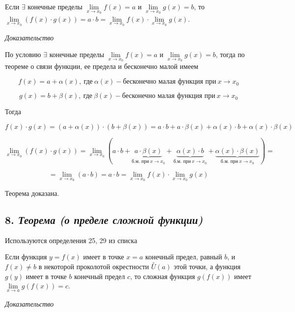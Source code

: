 Если $\exists$ конечные пределы $\lim\limits_{x \to x_0}f(x)=a$ и $\lim\limits_{x \to x_0}g(x) = b$, то $\lim\limits_{x \to x_0}(f(x)\cdot g(x)) = a\cdot b = \lim\limits_{x \to x_0}f(x)\cdot \lim\limits_{x \to x_0}g(x)$.
\vspace*{20pt} 

\textit{Доказательство}

По условию $\exists$ конечные пределы $\lim\limits_{x \to x_0}f(x)=a$ и $\lim\limits_{x \to x_0}g(x) = b$, тогда по теореме о связи функции, ее предела и бесконечно малой имеем

$$
f(x) = a + \alpha(x), \ \text{где} \ \alpha(x) - \text{бесконечно малая функция при} \ x \rightarrow x_0 
$$

$$
g(x) = b + \beta(x), \ \text{где} \ \beta(x) - \text{бесконечно малая функция при} \ x \rightarrow x_0 
$$

Тогда

$$
f(x)\cdot g(x) = (a + \alpha(x))\cdot(b + \beta(x)) = a\cdot b + a\cdot \beta(x) + \alpha(x)\cdot b + \alpha(x)\cdot \beta(x)
$$

$$
\lim\limits_{x \to x_0}(f(x)\cdot g(x)) = \lim\limits_{x \to x_0}(a\cdot b + \underbrace{a\cdot \beta(x)}_{\text{б.м. при} \ x \rightarrow x_0} + \underbrace{\alpha(x)\cdot b}_{\text{б.м. при} \ x \rightarrow x_0} + \underbrace{\alpha(x)\cdot \beta(x)}_{\text{б.м. при} \ x \rightarrow x_0}) =
$$

$$
= \lim\limits_{x \to x_0}(a\cdot b) = a\cdot b = \lim\limits_{x \to x_0}f(x) \cdot \lim\limits_{x \to x_0}g(x)
$$

Теорема доказана.
\newpage 
\subsection*{8. \textit{Теорема (о пределе сложной функции)}}
\begin{Quote2} 
\small\centering 

Используются определения 25, 29 из списка \end{Quote2} 

Если функция $y = f(x)$ имеет в точке $x = a$ конечный предел, равный $b$, и $f(x) \neq b$ в некоторой проколотой окрестности $\overset{\circ}U(a)$ этой точки, а функция $g(y)$ имеет в точке $b$ конечный предел $c$, то сложная функция $g(f(x))$ имеет $\lim\limits_{x \to a}g(f(x)) = c$.
\vspace*{20pt} 

\textit{Доказательство}

